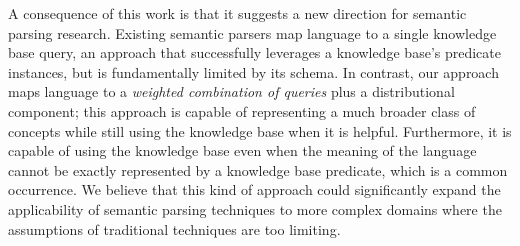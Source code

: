 \documentclass[11pt,letterpaper]{article}
\begin{document}
A consequence of this work is that it suggests a new direction for semantic
parsing research. Existing semantic parsers map language to a single knowledge
base query, an approach that successfully leverages a knowledge base's
predicate instances, but is fundamentally limited by its schema. In contrast,
our approach maps language to a \emph{weighted combination of queries} plus a
distributional component; this approach is capable of representing a much
broader class of concepts while still using the knowledge base when it is
helpful. Furthermore, it is capable of using the knowledge base even when the
meaning of the language cannot be exactly represented by a knowledge base
predicate, which is a common occurrence. We believe that this kind of approach
could significantly expand the applicability of semantic parsing techniques to
more complex domains where the assumptions of traditional techniques are too
limiting.




\end{document}
